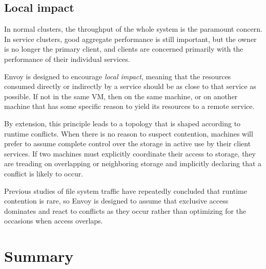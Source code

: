 \subsection{Local impact}

In normal clusters, the throughput of the whole system is the paramount concern. In service clusters, good aggregate performance is still important, but the owner is no longer the primary client, and clients are concerned primarily with the performance of their individual services.

Envoy is designed to encourage \emph{local impact}, meaning that the resources consumed directly or indirectly by a service should be as close to that service as possible. If not in the same VM, then on the same machine, or on another machine that has some specific reason to yield its resources to a remote service.

By extension, this principle leads to a topology that is shaped according to runtime conflicts. When there is no reason to suspect contention, machines will prefer to assume complete control over the storage in active use by their client services. If two machines must explicitly coordinate their access to storage, they are treading on overlapping or neighboring storage and implicitly declaring that a conflict is likely to occur.

Previous studies of file system traffic have repeatedly concluded that runtime contention is rare, so Envoy is designed to assume that exclusive access dominates and react to conflicts as they occur rather than optimizing for the occasions when access overlaps.

\section{Summary}

